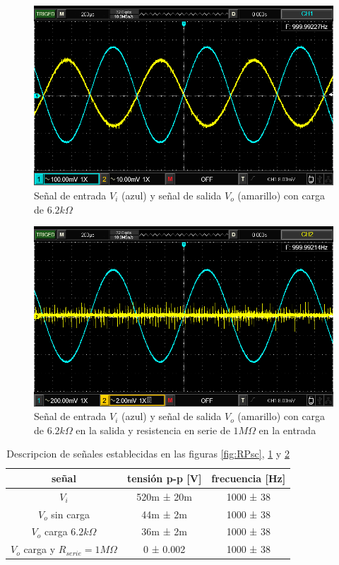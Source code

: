 \documentclass[12pt, a4paper]{article}
\begin{document}
    \begin{figure}[h!]
        \centering
        \includegraphics[height=6cm\textwidth]{p26cc.png}
        \caption{Señal de entrada $V_i$ (azul) y señal de salida $V_o$ (amarillo) con carga de $6.2k\Omega$}
        \label{fig:RPcc}
    \end{figure}

    \newpage

    \begin{figure}[h!]
        \centering
        \includegraphics[height=6cm\textwidth]{p26cc1M.png}
        \caption{Señal de entrada $V_i$ (azul) y señal de salida $V_o$ (amarillo) con carga de $6.2k\Omega$ en la salida y resistencia en serie de $1M\Omega$ en la entrada}
        \label{fig:RP1M}
    \end{figure}

    \begin{table}[h!]
        \centering
        \caption{Descripcion de señales establecidas en las figuras \ref{fig:RPsc}, \ref{fig:RPcc} y \ref{fig:RP1M}}
        \label{tab:p26}
        \begin{tabular}{|c|c|c|} \hline
            señal  &  tensión p-p [V] & frecuencia [Hz] \\ \hline
            $V_i$  &  520m ± 20m &  1000 ± 38  \\
            $V_o$ sin carga  &  44m ± 2m &  1000 ± 38  \\
            $V_o$ carga $6.2k\Omega$ &  36m ± 2m &  1000 ± 38  \\
            $V_o$ carga y $R_{serie}=1M\Omega$ &  0 ± 0.002 &  1000 ± 38  \\ \hline
        \end{tabular}
    \end{table}
\end{document}
